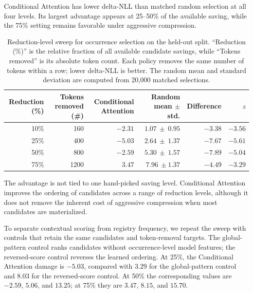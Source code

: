 Conditional Attention has lower delta-NLL than matched random selection at all four levels. Its largest advantage appears at 25--50\% of the available saving, while the 75\% setting remains favorable under aggressive compression.

\begin{table}[!b]
  \centering
  \footnotesize
  \setlength{\tabcolsep}{5pt}
  \renewcommand{\arraystretch}{1.06}
  \caption{Reduction-level sweep for occurrence selection on the held-out split. ``Reduction (\%)'' is the relative fraction of all available candidate savings, while ``Tokens removed'' is its absolute token count. Each policy removes the same number of tokens within a row; lower delta-NLL is better. The random mean and standard deviation are computed from 20,000 matched selections.}
  \vspace{-5pt}
  \label{tab:conditional_attention_reduction_sweep}
  \begin{tabular}{@{}rrrrrr@{}}
  \toprule
  \textbf{Reduction (\%)} & \textbf{Tokens removed (\#)} & \textbf{Conditional Attention} &
  \textbf{Random mean $\pm$ std.} & \textbf{Difference} & \textbf{$z$} \\
  \midrule
  10\% & 160  & $-2.31$ & $1.07\ \pm\ 0.95$ & $-3.38$ & $-3.56$ \\
  25\% & 400  & $-5.03$ & $2.64\ \pm\ 1.37$ & $-7.67$ & $-5.61$ \\
  50\% & 800  & $-2.59$ & $5.30\ \pm\ 1.57$ & $-7.89$ & $-5.04$ \\
  75\% & 1200 & $3.47$  & $7.96\ \pm 1.37$ & $-4.49$ & $-3.29$ \\
  \bottomrule
  \end{tabular}
\end{table}

The advantage is not tied to one hand-picked saving level. Conditional Attention improves the ordering of candidates across a range of reduction levels, although it does not remove the inherent cost of aggressive compression when most candidates are materialized.

To separate contextual scoring from registry frequency, we repeat the sweep
with controls that retain the same candidates and token-removal targets. The
global-pattern control ranks candidates without occurrence-level model
features; the reversed-score control reverses the learned ordering. At 25\%, the
Conditional Attention damage is $-5.03$, compared with $3.29$ for the global-pattern control
and $8.03$ for the reversed-score control. At 50\% the corresponding values are $-2.59$,
$5.06$, and $13.25$; at 75\% they are $3.47$, $8.15$, and $15.70$.

